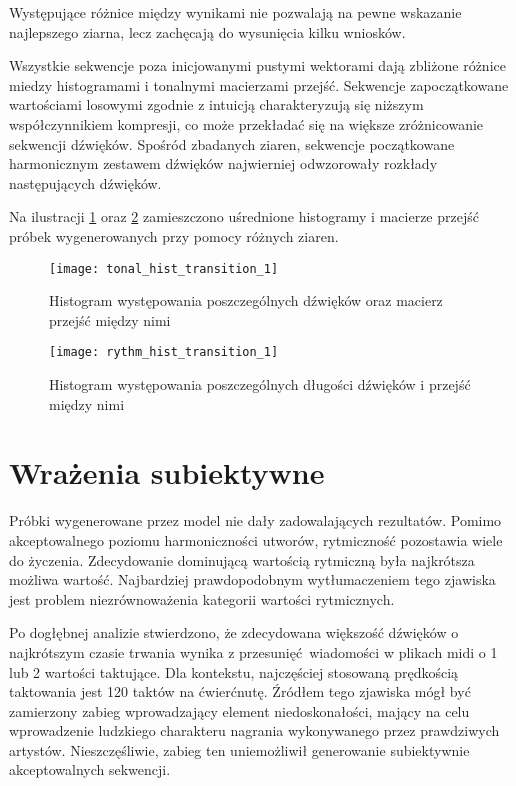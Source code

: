 {{        Występujące różnice między wynikami nie pozwalają na pewne wskazanie najlepszego ziarna, lecz 
        zachęcają do wysunięcia kilku wniosków.

        Wszystkie sekwencje poza inicjowanymi pustymi wektorami dają zbliżone różnice miedzy histogramami i 
        tonalnymi macierzami przejść. 
        Sekwencje zapoczątkowane wartościami losowymi zgodnie z intuicją charakteryzują się niższym współczynnikiem
        kompresji, co może przekładać się na większe zróżnicowanie sekwencji dźwięków.
        Spośród zbadanych ziaren, sekwencje początkowane harmonicznym zestawem dźwięków najwierniej
        odwzorowały rozkłady następujących dźwięków.
        
        Na ilustracji \ref{tonal_hist_transition_1} oraz \ref{rythm_hist_transition_1} zamieszczono uśrednione 
        histogramy i macierze przejść próbek wygenerowanych przy pomocy różnych ziaren.

        \begin{figure}
            \centering
            \texttt{[image: tonal\_hist\_transition\_1]}
            \caption{Histogram występowania poszczególnych dźwięków oraz macierz przejść między nimi}
            \label{tonal_hist_transition_1}
        \end{figure}

        \begin{figure}
            \centering
            \texttt{[image: rythm\_hist\_transition\_1]}
            \caption{Histogram występowania poszczególnych długości dźwięków i przejść między nimi}
            \label{rythm_hist_transition_1}
        \end{figure}
    }

    \section{Wrażenia subiektywne}
    {
        Próbki wygenerowane przez model nie dały zadowalających rezultatów. Pomimo akceptowalnego poziomu 
        harmoniczności utworów, rytmiczność pozostawia wiele do życzenia. Zdecydowanie dominującą wartością 
        rytmiczną była najkrótsza możliwa wartość. Najbardziej prawdopodobnym wytłumaczeniem tego zjawiska jest 
        problem niezrównoważenia kategorii wartości rytmicznych. 

        Po dogłębnej analizie stwierdzono, że zdecydowana większość dźwięków o najkrótszym czasie trwania
        wynika z przesunięć wiadomości w plikach midi o 1 lub 2 wartości taktujące. Dla kontekstu, najczęściej stosowaną
        prędkością taktowania jest 120 taktów na ćwierćnutę. Źródłem tego zjawiska mógł być zamierzony 
        zabieg wprowadzający element niedoskonałości, mający na celu wprowadzenie ludzkiego charakteru nagrania 
        wykonywanego przez prawdziwych artystów.
        Nieszczęśliwie, zabieg ten uniemożliwił generowanie subiektywnie akceptowalnych sekwencji.

}}
